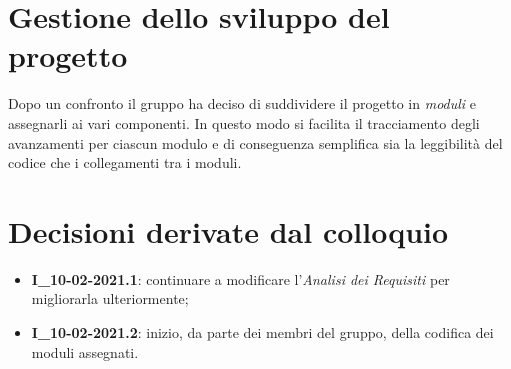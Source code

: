 \section{Gestione dello sviluppo del progetto}
Dopo un confronto il gruppo ha deciso di suddividere il progetto in \textit{moduli} e assegnarli ai vari componenti.
In questo modo si facilita il tracciamento degli avanzamenti per ciascun modulo e di conseguenza semplifica sia la leggibilità del codice che i collegamenti tra i moduli.


\section{Decisioni derivate dal colloquio}
  \begin{itemize}
    \item \textbf{I\_10-02-2021.1}: continuare a modificare l'\textit{Analisi dei Requisiti} per migliorarla ulteriormente;
    \item \textbf{I\_10-02-2021.2}: inizio, da parte dei membri del gruppo, della codifica dei moduli assegnati.
  \end{itemize}
